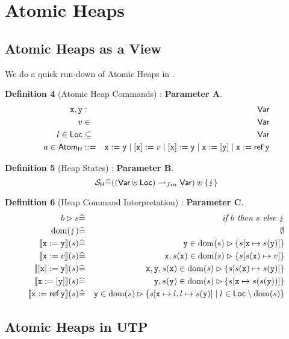 \section{Atomic Heaps}

\subsection{Atomic Heaps as a View}

We do a quick run-down of Atomic Heaps in \cite{conf/popl/Dinsdale-YoungBGPY13}.

\textbf{Definition 4 }(Atomic Heap Commands) : \textbf{Parameter A}.
\begin{eqnarray*}
   \mathtt{x},\mathtt{y} &:& \mathsf{Var}
\\ v &\in& \mathsf{Var}
\\ l \in \mathsf{Loc} &\subseteq& \mathsf{Var}
\\ a \in \mathsf{Atom_{H}}
   &::=&
   \mathtt{x} := \mathtt{y}
   \mid
   [\mathtt{x}] := v
   \mid
   [\mathtt{x}] := \mathtt{y}
   \mid
   \mathtt{x} := [\mathtt{y}]
   \mid
   \mathtt{x} := \mathop{\mathsf{ref}}\mathtt{y}
\end{eqnarray*}

\textbf{Definition 5} (Heap States) : \textbf{Parameter B}.
\[
 \mathcal{S}_{\mathsf{H}} \widehat= ((\mathsf{Var} \uplus \mathsf{Loc}) \rightharpoonup_{fin} \mathsf{Var}) \uplus \{\lightning\}
\]

\textbf{Definition 6} (Heap Command Interpretation) : \textbf{Parameter C}.
\begin{eqnarray*}
   b \rhd s &\defs& \textit{if }b\textit{ then }s\textit{ else }\bang
\\ \dom(\bang) &\defs& \emptyset
\\ \sem{\vx:=\vy}(s)
              &\defs& \vy \in \dom(s)\rhd \setof{s[\vx \mapsto s(\vy)]}
\\ \sem{\vx:=v}(s)
              &\defs& \vx,s(\vx) \in \dom(s)\rhd \setof{s[s(\vx) \mapsto v]}
\\ \sem{[\vx]:=\vy}(s)
              &\defs& \vx,\vy,s(\vx) \in \dom(s)\rhd \setof{s[s(\vx) \mapsto s(\vy)]}
\\ \sem{\vx:=[\vy]}(s)
              &\defs& \vy,s(\vy) \in \dom(s)\rhd \setof{s[\vx \mapsto s(s(\vy))]}
\\ \sem{\vx:=\reft\vy}(s)
              &\defs& \vy \in \dom(s)\rhd
              \setof{s[\vx \mapsto l,l \mapsto s(\vy)] \mid l \in \Loc \setminus \dom(s) }
\end{eqnarray*}


\subsection{Atomic Heaps in UTP}

